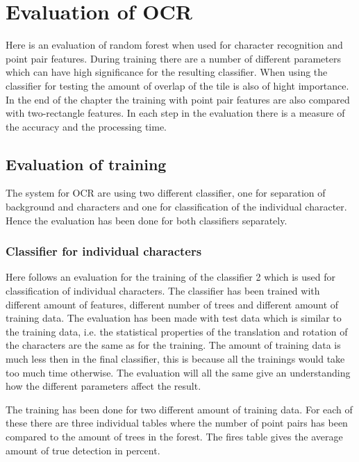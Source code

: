 
\chapter{Evaluation of OCR}
\label{sec:Evaluation of OCR}
Here is an evaluation of random forest when used for character recognition and point pair features. During training there are a number of different parameters which can have high significance for the resulting classifier. When using the classifier for testing the amount of overlap of the tile is also of hight importance. In the end of the chapter the training with point pair features are also compared with two-rectangle features. In each step in the evaluation there is a measure of the accuracy and the processing time.

\section{Evaluation of training}
\label{sec:Evaluation of training}
The system for OCR are using two different classifier, one for separation of background and characters and one for classification of the individual character. Hence the evaluation has been done for both classifiers separately.
 
\subsection{Classifier for individual characters}
\label{sec:Classifier for individual characters}
Here follows an evaluation for the training of the classifier 2 which is used for classification of individual characters. The classifier has been trained with different amount of features, different number of trees and different amount of training data. The evaluation has been made with test data which is similar to the training data, i.e. the statistical properties of the translation and rotation of the characters are the same as for the training. The amount of training data is much less then in the final classifier, this is because all the trainings would take too much time otherwise. The evaluation will all the same give an understanding how the different parameters affect the result. 

The training has been done for two different amount of training data. For each of these there are three individual tables where the number of point pairs has been compared to the amount of trees in the forest. The fires table gives the average amount of true detection in percent. 

